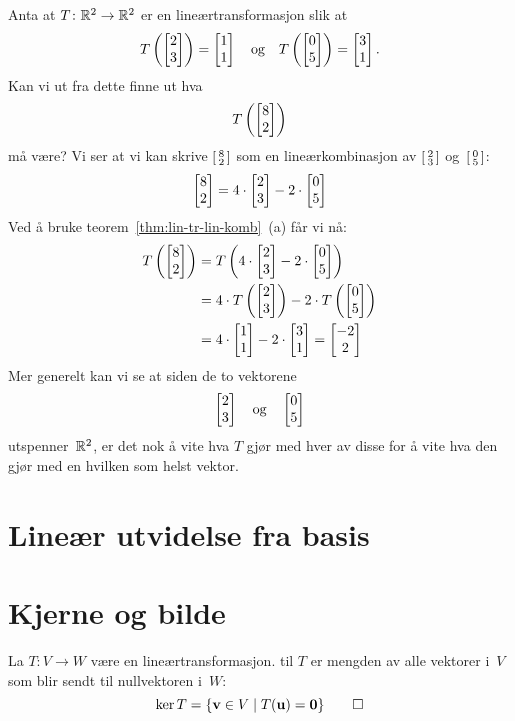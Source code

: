 \begin{ex}
Anta at $T \colon \R^2 \to \R^2$ er en lineærtransformasjon slik at
\[
T\left( \vv{2}{3} \right) = \vv{1}{1}
\quad\text{og}\quad
T\left( \vv{0}{5} \right) = \vv{3}{1}.
\]
Kan vi ut fra dette finne ut hva
\[
T\left( \vv{8}{2} \right)
\]
må være?  Vi ser at vi kan skrive $\vvS{8}{2}$ som en
lineærkombinasjon av $\vvS{2}{3}$ og~$\vvS{0}{5}$:
\[
\vv{8}{2} = 4 \cdot \vv{2}{3} - 2 \cdot \vv{0}{5}
\]
Ved å bruke teorem~\ref{thm:lin-tr-lin-komb}~(a) får vi nå:
\begin{align*}
T\left( \vv{8}{2} \right)
&= T\left( 4 \cdot \vv{2}{3} - 2 \cdot \vv{0}{5} \right) \\
&= 4 \cdot T\left( \vv{2}{3} \right) - 2 \cdot T\left( \vv{0}{5} \right) \\
&= 4 \cdot \vv{1}{1} - 2 \cdot \vv{3}{1}
 = \vv{-2}{2}
\end{align*}
Mer generelt kan vi se at siden de to vektorene
\[
\vv{2}{3}
\quad\text{og}\quad
\vv{0}{5}
\]
utspenner~$\R^2$, er det nok å vite hva $T$ gjør med hver av disse for
å vite hva den gjør med en hvilken som helst vektor.
\end{ex}



\section*{Lineær utvidelse fra basis}




\section*{Kjerne og bilde}


\begin{defn}
La $T \colon V \to W$ være en lineærtransformasjon.  
til $T$ er mengden av alle vektorer i~$V$ som blir sendt til
nullvektoren i~$W$:
\[
\ker T = \{ \v \in V \mid T(\u) = \0 \}\qedhere
\]
\end{defn}

